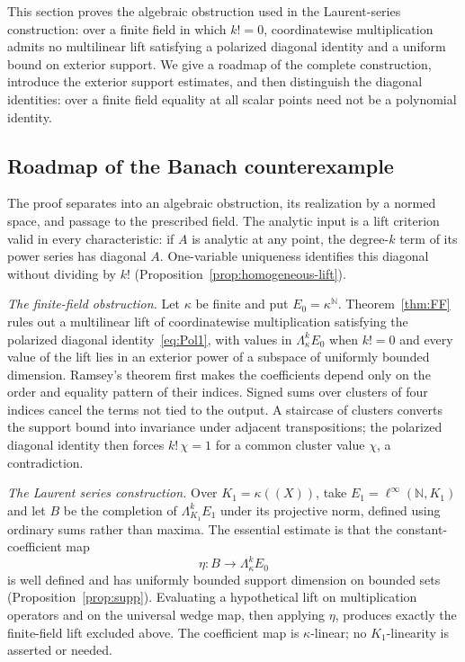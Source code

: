 \documentclass[11pt]{amsart}
\theoremstyle{definition}
\theoremstyle{remark}
\numberwithin{equation}{section}
\newcommand{\N}{\mathbb N}
\newcommand{\linf}{\ell^\infty}
\begin{document}
This section proves the algebraic obstruction used in the Laurent-series construction: over a finite field in which
$k!=0$, coordinatewise multiplication admits no multilinear lift satisfying a polarized diagonal identity and a
uniform bound on exterior support. We give a roadmap of the complete construction, introduce the exterior
support estimates, and then distinguish the diagonal identities: over a finite field equality at all scalar
points need not be a polynomial identity.

\subsection*{Roadmap of the Banach counterexample}
The proof separates into an algebraic obstruction, its realization by a normed space, and passage to the prescribed
field. The analytic input is a lift criterion valid in every characteristic: if $A$ is analytic at any point, the
degree-$k$ term of its power series has diagonal $A$. One-variable uniqueness identifies this diagonal without
dividing by $k!$ (Proposition~\ref{prop:homogeneous-lift}).

\emph{The finite-field obstruction.}
Let $\kappa$ be finite and put $E_0=\kappa^\N$. Theorem~\ref{thm:FF} rules out a multilinear lift of coordinatewise
multiplication satisfying the polarized diagonal identity~\eqref{eq:Pol1}, with values in $\Lambda^k_\kappa E_0$ when $k!=0$ and every value of the lift lies in an exterior power of a
subspace of uniformly bounded dimension. Ramsey's theorem first makes the coefficients depend only on the order
and equality pattern of their indices. Signed sums over clusters of four indices cancel the terms not tied to the
output. A staircase of clusters converts the support bound into invariance under adjacent transpositions; the
polarized diagonal identity then forces $k!\,\chi=1$ for a common cluster value $\chi$, a contradiction.

\emph{The Laurent series construction.}
Over $K_1=\kappa((X))$, take $E_1=\linf(\N,K_1)$ and let $B$ be the completion of
$\Lambda^k_{K_1}E_1$ under its projective norm, defined using ordinary sums rather than maxima. The essential
estimate is that the constant-coefficient map
\[
\eta\colon B\longrightarrow\Lambda^k_\kappa E_0
\]
is well defined and has uniformly bounded support dimension on bounded sets
(Proposition~\ref{prop:supp}). Evaluating a hypothetical lift on multiplication operators and on the universal
wedge map, then applying $\eta$, produces exactly the finite-field lift excluded above. The coefficient map
is $\kappa$\nobreakdash-linear; no $K_1$\nobreakdash-linearity is asserted or needed.
\end{document}
